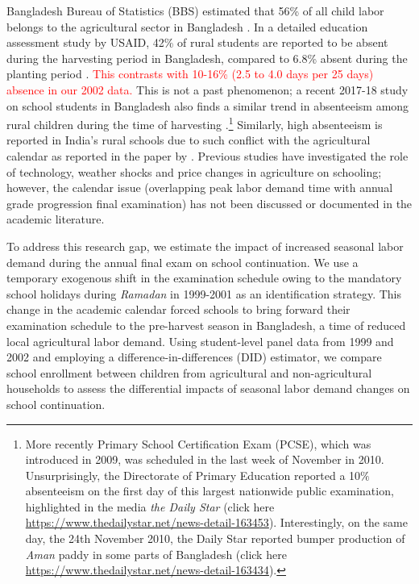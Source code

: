 \documentclass[12pt,letterpaper]{article}
\newcommand{\SAdded}[1]{\textcolor{red}{#1}}
\newcommand{\0}{\ensuremath{\mbox{\boldmath $0$}}}
\begin{document}
Bangladesh Bureau of Statistics (BBS) estimated that 56\% of all child labor belongs to the agricultural sector in Bangladesh \citep{bbs2003report}. In a detailed education assessment study by USAID, 42\% of rural students are reported to be absent during the harvesting period in Bangladesh, compared to 6.8\% absent during the planting period \citep[][Table IV.D.9, page 110]{Rahman2004}. \SAdded{This contrasts with 10-16\% (2.5 to 4.0 days per 25 days) absence in our 2002 data.} This is not a past phenomenon; a recent 2017-18 study on school students in Bangladesh also finds a similar trend in absenteeism among rural children during the time of harvesting \citep{Fujii2019}.\footnote{More recently Primary School Certification Exam (PCSE), which was introduced in 2009, was scheduled in the last week of November in 2010. Unsurprisingly, the Directorate of Primary Education reported a 10$\%$ absenteeism on the first day of this largest nationwide public examination, highlighted in the media \textit{the Daily Star} (click here \url{https://www.thedailystar.net/news-detail-163453}). Interestingly, on the same day, the 24th November 2010, the Daily Star reported bumper production of \textit{Aman} paddy in some parts of Bangladesh (click here \url{https://www.thedailystar.net/news-detail-163434}). } Similarly, high absenteeism is reported in India's rural schools due to such conflict with the agricultural calendar as reported in the paper by \cite{de2016estimating}. Previous studies have investigated the role of technology, weather shocks and price changes in agriculture on schooling; however, the calendar issue (overlapping peak labor demand time with annual grade progression final examination) has not been discussed or documented in the academic literature.

To address this research gap, we estimate the impact of increased seasonal labor demand during the annual final exam on school continuation. We use a temporary exogenous shift in the examination schedule owing to the mandatory school holidays during \textit{Ramadan} in 1999-2001 as an identification strategy. This change in the academic calendar forced schools to bring forward their examination schedule to the pre-harvest season in Bangladesh, a time of reduced local agricultural labor demand. Using student-level panel data from 1999 and 2002 and employing a difference-in-differences (DID) estimator, we compare school enrollment between children from agricultural and non-agricultural households to assess the differential impacts of seasonal labor demand changes on school continuation. 
\end{document}
